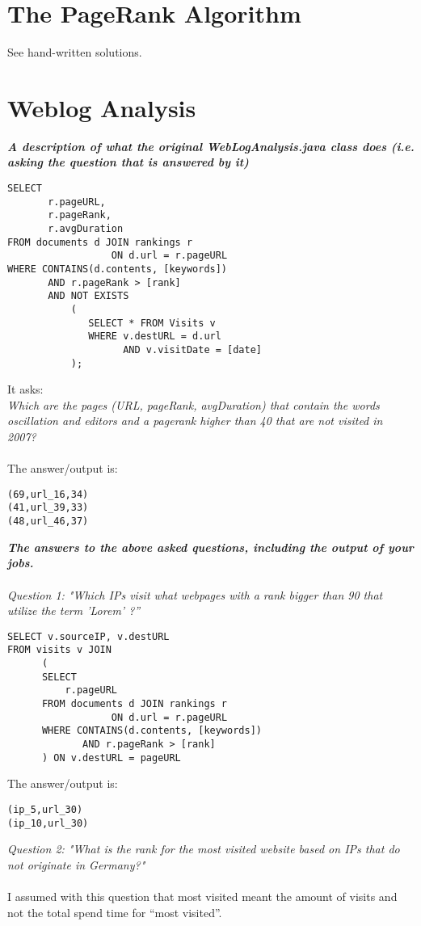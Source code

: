 \documentclass[11pt,a4paper,oneside]{article}
\begin{document}
\section{The PageRank Algorithm}
See hand-written solutions.

\section{Weblog Analysis}

\textbf{\textit{A description of what the original WebLogAnalysis.java class does (i.e. asking the question
that is answered by it)}}
\begin{verbatim}
SELECT
       r.pageURL,
       r.pageRank,
       r.avgDuration
FROM documents d JOIN rankings r
                  ON d.url = r.pageURL
WHERE CONTAINS(d.contents, [keywords])
       AND r.pageRank > [rank]
       AND NOT EXISTS
           (
              SELECT * FROM Visits v
              WHERE v.destURL = d.url
                    AND v.visitDate = [date]
           );
\end{verbatim}
It asks:
\\
\textit{Which are the pages (URL, pageRank, avgDuration) that contain the words oscillation and editors and a pagerank higher than 40 that are not visited in 2007?}\\
\\
The answer/output is:
\begin{verbatim}
(69,url_16,34)
(41,url_39,33)
(48,url_46,37)
\end{verbatim}

\noindent
\textbf{\textit{The answers to the above asked questions, including the output of your jobs.}}
\\
\\
\textit{Question 1: "Which IPs visit what webpages with a rank bigger than 90 that utilize the term
’Lorem’ ?”}
\begin{verbatim}
SELECT v.sourceIP, v.destURL
FROM visits v JOIN
      (
      SELECT
          r.pageURL
      FROM documents d JOIN rankings r
                  ON d.url = r.pageURL
      WHERE CONTAINS(d.contents, [keywords])
             AND r.pageRank > [rank]
      ) ON v.destURL = pageURL
\end{verbatim}
\noindent
The answer/output is:

\begin{verbatim}
(ip_5,url_30)
(ip_10,url_30)
\end{verbatim}
\noindent
\textit{Question 2: "What is the rank for the most visited website based on IPs that do not originate
in Germany?"}
\\
\\
I assumed with this question that most visited meant the amount of visits and not the total spend time for ``most visited''.
\end{document}
